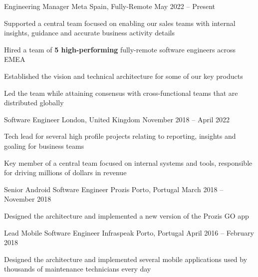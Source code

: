 \documentclass[]{awesome-cv}
\begin{document}
	
\vspace{-8mm}
\begin{cventries}

\vspace{-2mm}

\cventry
	{Engineering Manager}
	{Meta}
	{Spain, Fully-Remote}
	{May 2022 – Present}
	{\begin{cvitems}
		\item {Supported a central team focused on enabling our sales teams with internal insights, guidance and accurate business activity details}
		\item {Hired a team of \textbf{5 high-performing} fully-remote software engineers across EMEA}
		\item {Established the vision and technical architecture for some of our key products}
		\item {Led the team while attaining consensus with cross-functional teams that are distributed globally}
	\end{cvitems}}


	\vspace{-6mm}
	\cventry
	{Software Engineer}
	{}
	{London, United Kingdom}
	{November 2018 – April 2022}
	{\begin{cvitems}
		\item {Tech lead for several high profile projects relating to reporting, insights and goaling for business teams}
		\item {Key member of a central team focused on internal systems and tools, responsible for driving millions of dollars in revenue}
	\end{cvitems}}

	\vspace{-4mm}
	\cventry
	{Senior Android Software Engineer}
	{Prozis}
	{Porto, Portugal}
	{March 2018 – November 2018}
	{\begin{cvitems}
		\item {Designed the architecture and implemented a new version of the Prozis GO app}
	\end{cvitems}}



	\vspace{-4mm}
	\cventry
	{Lead Mobile Software Engineer}
	{Infraspeak}
	{Porto, Portugal}
	{April 2016 – February 2018}
	{\begin{cvitems}
		\item {Designed the architecture and implemented several mobile applications used by thousands of maintenance technicians every day}
		\end{cvitems}}


\end{cventries}
\end{document}
